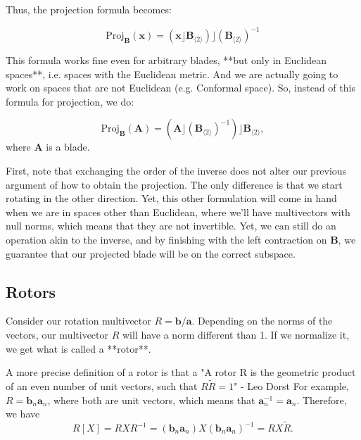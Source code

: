 Thus, the projection formula becomes:

\begin{displaymath}
    \text{Proj}_{\mathbf B} (\mathbf x) = \left(\mathbf x \rfloor \mathbf B_{\langle 2 \rangle}\right) \rfloor \left(\mathbf B_{\langle 2 \rangle}\right)^{-1}
\end{displaymath}

This formula works fine even for arbitrary blades, **but only in Euclidean spaces**, i.e. spaces with the Euclidean metric.
And we are actually going to work on spaces that are not Euclidean (e.g. Conformal space). So, instead of
this formula for projection, we do:

\begin{displaymath}
    \text{Proj}_{\mathbf B} (\mathbf A) = \left(\mathbf A \rfloor \left(\mathbf B_{\langle 2 \rangle}\right)^{-1}\right) \rfloor \mathbf B_{\langle 2 \rangle},
\end{displaymath}
where $\mathbf A$ is a blade.

First, note that exchanging the order of the inverse does not alter our previous argument of how to obtain the projection. The only
difference is that we start rotating in the other direction. Yet, this other formulation will come in hand when we are in
spaces other than Euclidean, where we'll have multivectors with null norms, which means that they are not invertible. Yet,
we can still do an operation akin to the inverse, and by finishing with the left contraction on $\mathbf B$,
we guarantee that our projected blade will be on the correct subspace.

\subsection{Rotors}

Consider our rotation multivector $R = \mathbf b / \mathbf a$. Depending on the norms
of the vectors, our multivector $R$ will have a norm different than 1. If we normalize it,
we get what is called a **rotor**.

A more precise definition of a rotor is that a
"A rotor R is the geometric product of an even number of unit vectors, such that $R \tilde{R} = 1$" - Leo Dorst
For example, $R = \mathbf b_n \mathbf a_n$, where both are unit vectors, which means that $\mathbf a_n^{-1} = \mathbf a_n$.
Therefore, we have
\begin{displaymath}
    R[X] = R X R^{-1} = (\mathbf b_n \mathbf a_n) X (\mathbf b_n \mathbf a_n)^{-1}  = R X \tilde{R}.
\end{displaymath}

